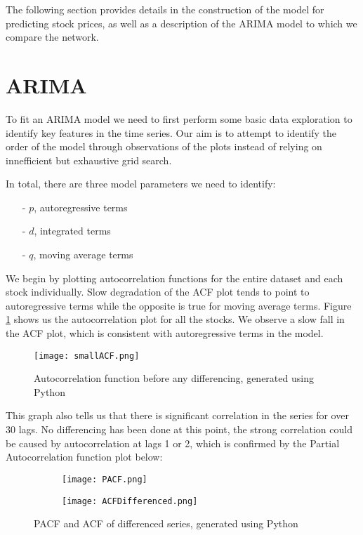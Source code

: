 \graphicspath{{./figures/}}

The following section provides details in the construction of the model for predicting stock prices, as well as a description of the ARIMA model to which we compare the network.

\section{ARIMA}
To fit an ARIMA model we need to first perform some basic data exploration to identify key features in the time series. Our aim is to attempt to identify the order of the model through observations of the plots instead of relying on innefficient but exhaustive grid search. 

In total, there are three model parameters we need to identify:
\begin{itemize}[nosep]
    \item[-] $p$, autoregressive terms
    \item[-] $d$, integrated terms
    \item[-] $q$, moving average terms
\end{itemize}%

We begin by plotting autocorrelation functions for the entire dataset and each stock individually. Slow degradation of the ACF plot tends to point to autoregressive terms while the opposite is true for moving average terms. Figure \ref{tab:smallACF} shows us the autocorrelation plot for all the stocks. We observe a slow fall in the ACF plot, which is consistent with autoregressive terms in the model.

\begin{figure}[H]
    \centering
    \texttt{[image: smallACF.png]}
    \caption{Autocorrelation function before any differencing, generated using Python}
    \label{tab:smallACF}    
\end{figure}

This graph also tells us that there is significant correlation in the series for over 30 lags. No differencing has been done at this point, the strong correlation could be caused by autocorrelation at lags 1 or 2, which is confirmed by the Partial Autocorrelation function plot below:

\begin{figure}[H]
    \centering
    \begin{subfigure}{.5\textwidth}
        \centering
        \texttt{[image: PACF.png]}
        \label{tab:PACF}        
    \end{subfigure}%
    \begin{subfigure}{.5\textwidth}
        \centering
        \texttt{[image: ACFDifferenced.png]}
        \label{tab:differenced}
    \end{subfigure}
    \caption{PACF and ACF of differenced series, generated using Python}
\end{figure}


